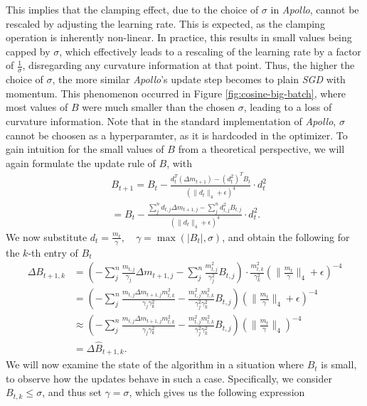 This implies that the clamping effect, due to the choice of $\sigma$ in \emph{Apollo}, cannot be rescaled by adjusting the learning rate. 
This is expected, as the clamping operation is inherently non-linear.
In practice, this results in small values being capped by $\sigma$, which effectively leads to a rescaling of the learning rate by a 
factor of $\frac{1}{\sigma}$, disregarding any curvature information at that point. Thus, the higher the choice of $\sigma$,
the more similar \emph{Apollo}'s update step becomes to plain \emph{SGD} with momentum.
This phenomenon occurred in Figure \ref{fig:cosine-big-batch}, where most values of $B$ were much smaller than the chosen $\sigma$,
leading to a loss of curvature information.
Note that in the standard implementation of \emph{Apollo}, $\sigma$ cannot be choosen as a hyperparamter, as it is hardcoded in the optimizer.
To gain intuition for the small values of $B$ from a theoretical perspective, we will again formulate the update rule of $B$, with
\begin{align}
    &B_{t+1} =  B_t - \frac{d_t^T (\Delta m_{t+1}) - (d_t^2)^T B_t}{\left( \|d_t\|_4 + \epsilon \right)^4} \cdot d_t^2 \\
    &= B_t - \frac{\sum^n_j{d_{t,j}\Delta m_{t+1,j} - \sum^n_j{d_{t,j}^2 B_{t,j} }}}{\left( \|d_t\|_4 + \epsilon \right)^4} \cdot d_t^2.
\end{align}
We now substitute $d_t = \frac{m_t}{\gamma}, \quad \gamma = \max(|B_t|, \sigma)$, and obtain the following for the $k$-th entry of $B_t$
\begin{align*}
    \Delta B_{t+1,k} &=\left(-\displaystyle\sum^n_j \frac{m_{t,j}}{\gamma_j } \Delta m_{t+1,j} - \displaystyle\sum^n_j \frac{m_{t,j}^2}{\gamma_j ^2} B_{t,j}\right) \cdot \frac{m_{t,k}^2}{\gamma_k^2} \left( \|\frac{m_t}{\gamma}\|_4 + \epsilon \right)^{-4}  \\
    &= \left(-\displaystyle\sum^n_j \frac{m_{t,j}\Delta m_{t+1,j}m_{t,k}^2}{\gamma_j \gamma_k^2} - \frac{m_{t,j}^2m_{t,k}^2}{\gamma_j ^2\gamma_k^2} B_{t,j}\right) \left( \|\frac{m_t}{\gamma}\|_4 + \epsilon \right)^{-4}  \\
    &\approx \left(-\displaystyle\sum^n_j \frac{m_{t,j}\Delta m_{t+1,j}m_{t,k}^2}{\gamma_j \gamma_k^2} - \frac{m_{t,j}^2m_{t,k}^2}{\gamma_j ^2\gamma_k^2} B_{t,j}\right) \left( \|\frac{m_t}{\gamma}\|_4\right)^{-4}  \\
    &=  \Delta \hat{B}_{t+1,k}.
\end{align*}
We will now examine the state of the algorithm in a situation where $B_t$ is small, to observe how the updates behave in such a case.
Specifically, we consider $B_{t,k} \leq \sigma$, and thus set $\gamma = \sigma$, which gives us the following expression

